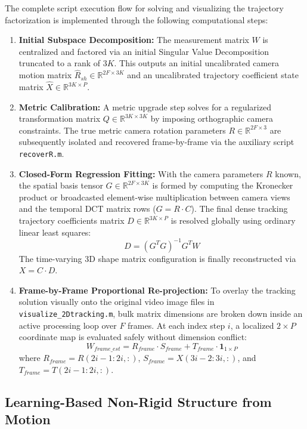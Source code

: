 \documentclass{article}
\begin{document}
The complete script execution flow for solving and visualizing the trajectory factorization is implemented through the following computational steps:
\begin{enumerate}
    \item \textbf{Initial Subspace Decomposition:} The measurement matrix $W$ is centralized and factored via an initial Singular Value Decomposition truncated to a rank of $3K$. This outputs an initial uncalibrated camera motion matrix $\hat{R}_{sh} \in \mathbb{R}^{2F \times 3K}$ and an uncalibrated trajectory coefficient state matrix $\hat{X} \in \mathbb{R}^{3K \times P}$.
    \item \textbf{Metric Calibration:} A metric upgrade step solves for a regularized transformation matrix $Q \in \mathbb{R}^{3K \times 3K}$ by imposing orthographic camera constraints. The true metric camera rotation parameters $R \in \mathbb{R}^{2F \times 3}$ are subsequently isolated and recovered frame-by-frame via the auxiliary script \texttt{recoverR.m}.
    \item \textbf{Closed-Form Regression Fitting:} With the camera parameters $R$ known, the spatial basis tensor $G \in \mathbb{R}^{2F \times 3K}$ is formed by computing the Kronecker product or broadcasted element-wise multiplication between camera views and the temporal DCT matrix rows ($G = R \cdot C$). The final dense tracking trajectory coefficients matrix $D \in \mathbb{R}^{3K \times P}$ is resolved globally using ordinary linear least squares:
    \begin{equation}
    D = (G^T G)^{-1}G^T W
    \end{equation}
    The time-varying 3D shape matrix configuration is finally reconstructed via $X = C \cdot D$.
    \item \textbf{Frame-by-Frame Proportional Re-projection:} To overlay the tracking solution visually onto the original video image files in \texttt{visualize\_2Dtracking.m}, bulk matrix dimensions are broken down inside an active processing loop over $F$ frames. At each index step $i$, a localized $2 \times P$ coordinate map is evaluated safely without dimension conflict:
    \begin{equation}
    W_{frame\_est} = R_{frame} \cdot S_{frame} + T_{frame} \cdot \mathbf{1}_{1 \times P}
    \end{equation}
    where $R_{frame} = R(2i-1:2i, :)$, $S_{frame} = X(3i-2:3i, :)$, and $T_{frame} = T(2i-1:2i, :)$.
\end{enumerate}

\subsection{Learning-Based Non-Rigid Structure from Motion}
\end{document}
